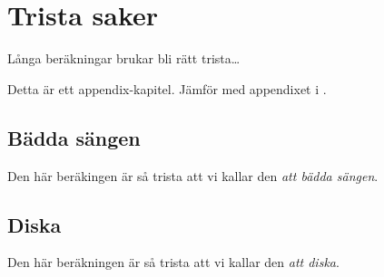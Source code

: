 \chapter{Trista saker}\label{cha:boring}
Långa beräkningar brukar bli rätt trista\dots

Detta är ett appendix-kapitel.  Jämför med appendixet i .

\section{Bädda sängen}

Den här beräkingen är så trista att vi kallar den \emph{att bädda sängen}.

\section{Diska}

Den här beräkningen är så trista att vi kallar den \emph{att diska}.
